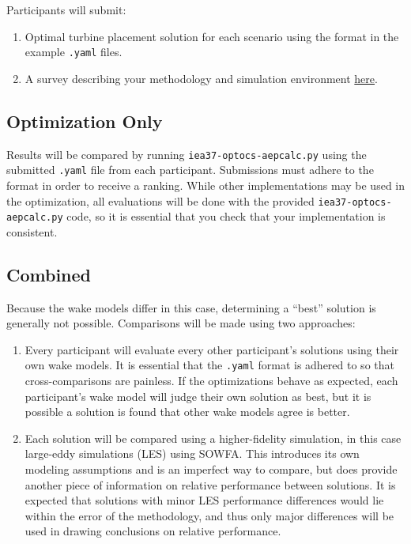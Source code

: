 \documentclass{article}
\begin{document}
    Participants will submit:
    \begin{enumerate}
        \item Optimal turbine placement solution for each scenario using the format in the example \texttt{.yaml} files. 
        \item A survey describing your methodology and simulation environment \href{https://goo.gl/forms/2tX3eJ0rlnElmTgR2}{here}.
    \end{enumerate}

    \subsection{Optimization Only}

        Results will be compared by running \texttt{iea37-optocs-aepcalc.py} using the submitted \texttt{.yaml} file from each participant.  Submissions must adhere to the format in order to receive a ranking.  While other implementations may be used in the optimization, all evaluations will be done with the provided \texttt{iea37-optocs-aepcalc.py} code, so it is essential that you check that your implementation is consistent.

    \subsection{Combined}

        Because the wake models differ in this case, determining a ``best'' solution is generally not possible.  Comparisons will be made using two approaches:
        \begin{enumerate}
            \item Every participant will evaluate every other participant's solutions using their own wake models.  It is essential that the \texttt{.yaml} format is adhered to so that cross-comparisons are painless.  If the optimizations behave as expected, each participant's wake model will judge their own solution as best, but it is possible a solution is found that other wake models agree is better.
            \item Each solution will be compared using a higher-fidelity simulation, in this case large-eddy simulations (LES) using SOWFA.  This introduces its own modeling assumptions and is an imperfect way to compare, but does provide another piece of information on relative performance between solutions.  It is expected that solutions with minor LES performance differences would lie within the error of the methodology, and thus only major differences will be used in drawing conclusions on relative performance.
        \end{enumerate}
\end{document}
